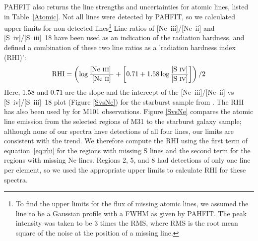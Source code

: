 PAHFIT also returns the line strengths and uncertainties for atomic lines, listed in Table~\ref{Atomic}.
Not all lines were detected by PAHFIT, so we calculated upper limits for non-detected lines\footnote{To find 
the upper limits for the flux of missing atomic lines, we assumed the line to be a 
Gaussian profile with a FWHM as given by PAHFIT. The peak intensity was taken to be 3 times the RMS, where RMS is the root mean square of 
the noise at the position of a missing line.}
Line ratios of [Ne~{\sc iii}]/[Ne~{\sc ii}] and [S~{\sc iv}]/[S~{\sc iii}]~18 have been used as an indication of the radiation hardness, and
\citet{Engelbracht_2008} defined a combination of these two line ratios as a 'radiation hardness index (RHI)':
%
\begin{equation}
{\rm RHI} = \left( \log\frac{\textrm{[Ne~{\sc iii}] }}{\textrm{[Ne~{\sc ii}]}} + \left[0.71 + 1.58\log\frac{\textrm{{[S~{\sc iv}]}}}{\textrm{{[S~{\sc iv}]}}}\right]\right) /2
\end{equation}
\label{eq:rhi}
%
Here, 1.58 and 0.71 are the slope and the intercept of the [Ne~{\sc iii}]/[Ne~{\sc ii}]  vs [S~{\sc iv}]/[S~{\sc iii}]~18 plot (Figure \ref{SvsNe}) for the starburst sample from 
\citet{Engelbracht_2008}. The RHI has also been used by \citet{Gordon:2008lr} for M101 observations. 
Figure \ref{SvsNe}  compares the atomic line emission from the selected regions of M31 to the starburst galaxy sample;
although none of our spectra have detections of all four lines, our limits are consistent with the trend.
We therefore compute the RHI using the first term of equation~\ref{eq:rhi} for the regions with missing S lines
and the second term for the regions with missing Ne lines.
Regions 2, 5, and 8 had detections of only one line per element, so we used the appropriate upper limits 
to calculate RHI for these spectra.


